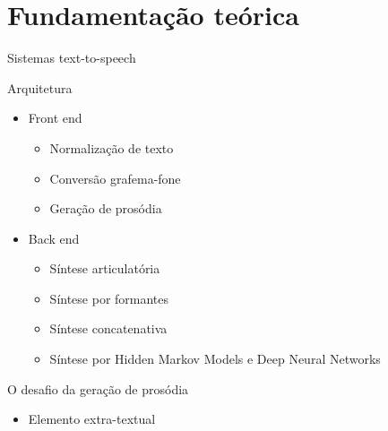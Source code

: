 \documentclass{beamer}
\begin{document}
\section{Fundamentação teórica}
\begin{frame}{Sistemas text-to-speech}
  \begin{figure}[!htbp]
  \centering
  \label{fig:tts-arch}
  \end{figure}

\end{frame}

\begin{frame}{Arquitetura}
  \begin{itemize}
    \item Front end
    \begin{itemize}
      \item Normalização de texto
      \item Conversão grafema-fone
      \item Geração de prosódia
    \end{itemize}
    \item Back end
    \begin{itemize}
      \item Síntese articulatória
      \item Síntese por formantes
      \item Síntese concatenativa
      \item Síntese por Hidden Markov Models e Deep Neural Networks
    \end{itemize}
  \end{itemize}
\end{frame}

\begin{frame}{O desafio da geração de prosódia}
  \begin{itemize}
    \item Elemento extra-textual
  \end{itemize}
\end{frame}
\end{document}
